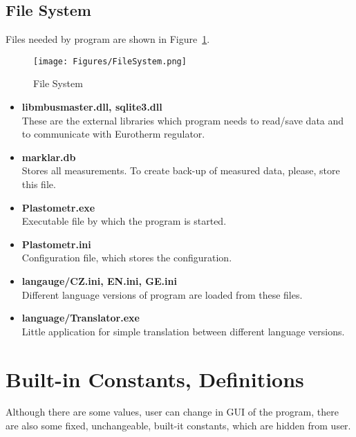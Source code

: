 \documentclass[a4paper,11pt,twoside]{book}
\theoremstyle{named}
\begin{document}
\subsection{File System}

Files needed by program are shown in Figure~\ref{fig:FileSystem}.

\begin{figure}[t]
  \centering
  \texttt{[image: Figures/FileSystem.png]}
  \caption{File System}
  \label{fig:FileSystem}
\end{figure}

\begin{itemize}
  \item \textbf{libmbusmaster.dll, sqlite3.dll} \\
    These are the external libraries which program needs to read/save data and
    to communicate with Eurotherm regulator.
  \item \textbf{marklar.db} \\
    Stores all measurements. To create back-up of measured data, please, store
    this file. 
  \item \textbf{Plastometr.exe} \\
    Executable file by which the program is started. 
  \item \textbf{Plastometr.ini} \\
    Configuration file, which stores the configuration. 
  \item \textbf{langauge/CZ.ini, EN.ini, GE.ini} \\
    Different language versions of program are loaded from these files.
  \item \textbf{language/Translator.exe} \\
    Little application for simple translation between different language
    versions.
\end{itemize}

\section{Built-in Constants, Definitions}
\label{sec:BulitInConstants}

Although there are some values, user can change in GUI of the program, there are
also some fixed, unchangeable, built-it constants, which are hidden from user. 
\end{document}
